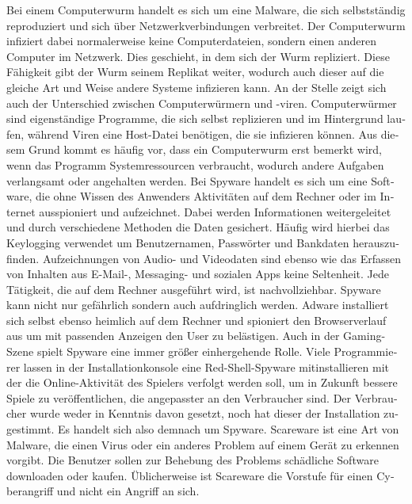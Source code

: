 \begin{otherlanguage}{ngerman}
    \newline Bei einem Computerwurm handelt es sich um eine Malware, die sich selbstständig reproduziert und sich über Netzwerkverbindungen verbreitet.
    Der Computerwurm infiziert dabei normalerweise keine Computerdateien, sondern einen anderen Computer im Netzwerk. Dies geschieht, in dem sich der Wurm repliziert. Diese Fähigkeit gibt der Wurm seinem Replikat weiter, wodurch auch dieser auf die gleiche Art und Weise andere Systeme infizieren kann. 
    \newline An der Stelle zeigt sich auch der Unterschied zwischen Computerwürmern und -viren. Computerwürmer sind eigenständige Programme, die sich selbst replizieren und im Hintergrund laufen, während Viren eine Host-Datei benötigen, die sie infizieren können. Aus diesem Grund kommt es häufig vor, dass ein Computerwurm erst bemerkt wird, wenn das Programm Systemressourcen verbraucht, wodurch andere Aufgaben verlangsamt oder angehalten werden.
    \newline Bei Spyware handelt es sich um eine Software, die ohne Wissen des Anwenders Aktivitäten auf dem Rechner oder im Internet ausspioniert und aufzeichnet. 
    Dabei werden Informationen weitergeleitet und durch verschiedene Methoden die Daten gesichert. Häufig wird hierbei das Keylogging verwendet um Benutzernamen, Passwörter und Bankdaten herauszufinden. Aufzeichnungen von Audio- und Videodaten sind ebenso wie das Erfassen von Inhalten aus E-Mail-, Messaging- und sozialen Apps keine Seltenheit. Jede Tätigkeit, die auf dem Rechner ausgeführt wird, ist nachvollziehbar. 
    Spyware kann nicht nur gefährlich sondern auch aufdringlich werden. Adware installiert sich selbst ebenso heimlich auf dem Rechner und spioniert den Browserverlauf aus um mit passenden Anzeigen den User zu belästigen.
    Auch in der Gaming-Szene spielt Spyware eine immer größer einhergehende Rolle. Viele Programmierer lassen in der Installationkonsole eine Red-Shell-Spyware mitinstallieren mit der die Online-Aktivität des Spielers verfolgt werden soll, um in Zukunft bessere Spiele zu veröffentlichen, die angepasster an den Verbraucher sind. Der Verbraucher wurde weder in Kenntnis davon gesetzt, noch hat dieser der Installation zugestimmt.
    Es handelt sich also demnach um Spyware.
    Scareware ist eine Art von Malware, die einen Virus oder ein anderes Problem auf einem Gerät zu erkennen vorgibt. Die Benutzer sollen zur Behebung des Problems schädliche Software downloaden oder kaufen. Üblicherweise ist Scareware die Vorstufe für einen Cyberangriff und nicht ein Angriff an sich.


\end{otherlanguage}
